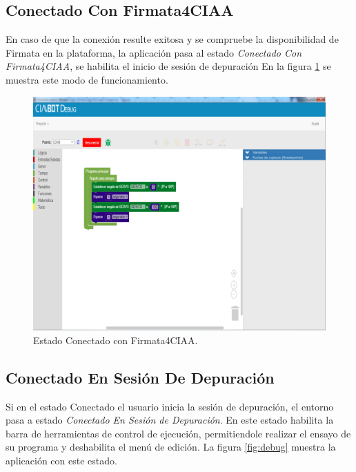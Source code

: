 \subsection{Conectado Con Firmata4CIAA}
\label{subsec:Conectado Con Firmata4CIAA}

En caso de que la conexión resulte exitosa y se compruebe la disponibilidad de Firmata en la plataforma, la aplicación pasa al estado \emph{Conectado Con Firmata4CIAA}, se habilita el inicio de sesión de depuración
En la figura \ref{fig:conectado} se muestra este modo de funcionamiento.


\begin{figure}[!htbp]
	\begin{center}  %
		\includegraphics[width=15cm]{./Figures/debug-conectado.png}
		\par\caption{Estado Conectado con Firmata4CIAA.}\label{fig:conectado}
	\end{center}
\end{figure}

\subsection{Conectado En Sesión De Depuración}
\label{subsec:Conectado En Sesion De Depuración}

Si en el estado Conectado el usuario inicia la sesión de depuración, el entorno pasa a estado \emph{Conectado En Sesión de Depuración}. En este estado habilita la barra de herramientas de control de ejecución, permitiendole realizar el ensayo de su programa y deshabilita el menú de edición. La figura \ref{fig:debug} muestra la aplicación con este estado.

